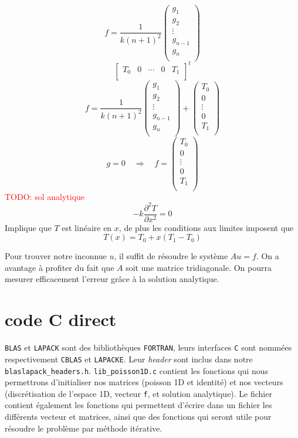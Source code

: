 \documentclass{article}
\begin{document}
\[
	f = \frac{1}{k(n+1)^2}
	\begin{pmatrix}
		g_1 \\ g_2 \\ \vdots \\ g_{n-1} \\ g_n \\
	\end{pmatrix}
\]
\[
	\begin{bmatrix}
		T_0 & 0 & \cdots & 0 & T_1 \\
	\end{bmatrix}^t
\]
\[
	f = \frac{1}{k(n+1)^2}
	\begin{pmatrix}
		g_1 \\ g_2 \\ \vdots \\ g_{n-1} \\ g_n \\
	\end{pmatrix} 
	+ \begin{pmatrix}
		T_0 \\ 0 \\ \vdots \\ 0 \\ T_1 \\
	\end{pmatrix}
\]
\[
	g = 0 \quad	\Longrightarrow \quad 
	f = \begin{pmatrix}
		T_0 \\ 0 \\ \vdots \\ 0 \\ T_1 \\
	\end{pmatrix}
\]
\textcolor{red}{TODO: sol analytique}
\[
	-k \frac{\partial^2 T}{\partial x^2} = 0
\]
	Implique que $T$ est linéaire en $x$, de plus les conditions aux limites imposent que 
\[
	T(x) = T_0 + x(T_1 - T_0)
\]

Pour trouver notre inconnue $u$, il suffit de résoudre le système \(Au = f\). On a avantage à profiter du fait que $A$ soit une matrice tridiagonale. On pourra mesurer efficacement l'erreur grâce à la solution analytique.


\section{code C direct}

\texttt{BLAS} et \texttt{LAPACK} sont des bibliothèques \texttt{FORTRAN}, leurs interfaces \texttt{C} sont nommées respectivement \texttt{CBLAS} et \texttt{LAPACKE}. Leur \textit{header} sont inclus dans notre \texttt{blaslapack\_headers.h}. \texttt{lib\_poisson1D.c} contient les fonctions qui nous permettrons d'initialiser nos matrices (poisson 1D et identité) et nos vecteurs (discrétisation de l'espace 1D, vecteur \texttt{f}, et solution analytique). Le fichier contient également les fonctions qui permettent d'écrire dans un fichier les différents vecteur et matrices, ainsi que des fonctions qui seront utile pour résoudre le problème par méthode itérative.
\end{document}
